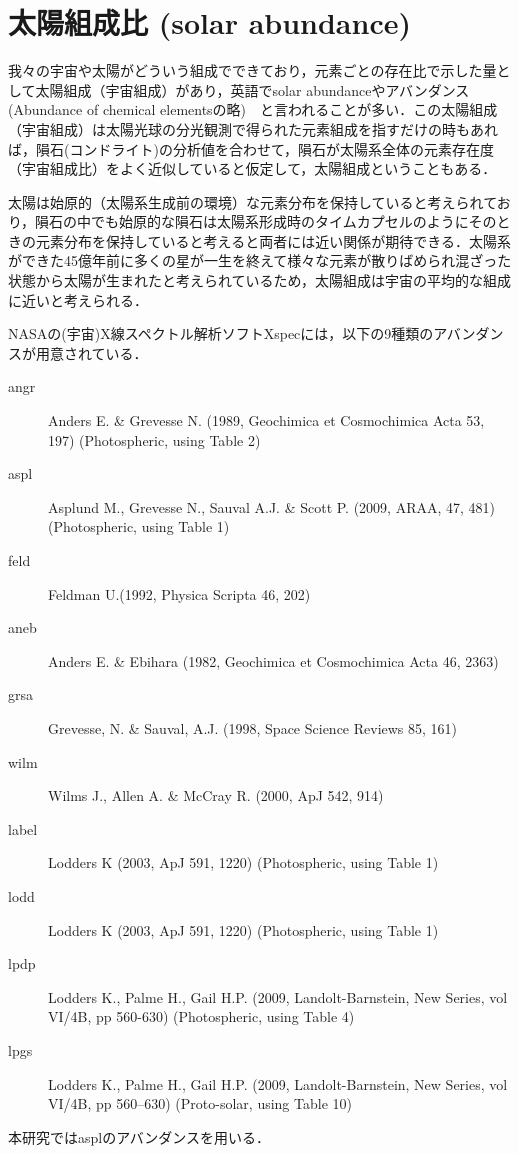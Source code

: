 \section{太陽組成比 (solar abundance)}

我々の宇宙や太陽がどういう組成でできており，元素ごとの存在比で示した量として太陽組成（宇宙組成）があり，英語でsolar abundanceやアバンダンス (Abundance of chemical elementsの略)　と言われることが多い．この太陽組成（宇宙組成）は太陽光球の分光観測で得られた元素組成を指すだけの時もあれば，隕石(コンドライト)の分析値を合わせて，隕石が太陽系全体の元素存在度（宇宙組成比）をよく近似していると仮定して，太陽組成ということもある．

太陽は始原的（太陽系生成前の環境）な元素分布を保持していると考えられており，隕石の中でも始原的な隕石は太陽系形成時のタイムカプセルのようにそのときの元素分布を保持していると考えると両者には近い関係が期待できる．太陽系ができた45億年前に多くの星が一生を終えて様々な元素が散りばめられ混ざった状態から太陽が生まれたと考えられているため，太陽組成は宇宙の平均的な組成に近いと考えられる．

NASAの(宇宙)X線スペクトル解析ソフトXspecには，以下の9種類のアバンダンスが用意されている．
\begin{description}
	\item[angr] Anders E. \& Grevesse N. (1989, Geochimica et Cosmochimica Acta 53, 197) (Photospheric, using Table 2)
	\item[aspl] Asplund M., Grevesse N., Sauval A.J. \& Scott P. (2009, ARAA, 47, 481) (Photospheric, using Table 1)
	\item[feld] Feldman U.(1992, Physica Scripta 46, 202)
	\item[aneb] Anders E. \& Ebihara (1982, Geochimica et Cosmochimica Acta 46, 2363)
	\item[grsa] Grevesse, N. \& Sauval, A.J. (1998, Space Science Reviews 85, 161)
	\item[wilm] Wilms J., Allen A. \& McCray R. (2000, ApJ 542, 914)
	\item[label] Lodders K (2003, ApJ 591, 1220) (Photospheric, using Table 1)
	\item[lodd] Lodders K (2003, ApJ 591, 1220) (Photospheric, using Table 1)
	\item[lpdp] Lodders K., Palme H., Gail H.P. (2009, Landolt-Barnstein, New Series, vol VI/4B, pp 560-630) (Photospheric, using Table 4)
	\item[lpgs] Lodders K., Palme H., Gail H.P. (2009, Landolt-Barnstein, New Series, vol VI/4B, pp 560--630) (Proto-solar, using Table 10)
\end{description}

本研究ではasplのアバンダンスを用いる．